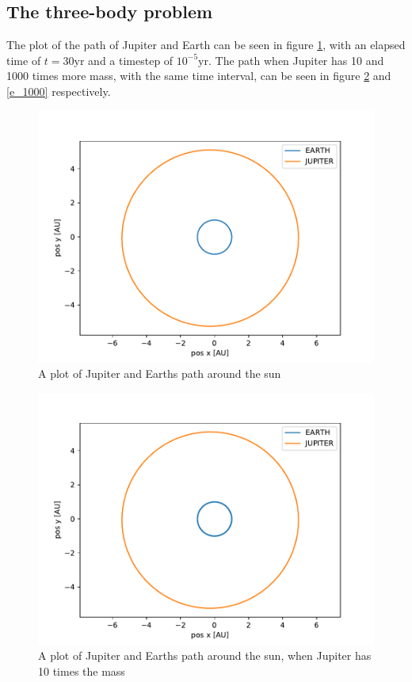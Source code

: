 \documentclass[a4paper]{article}
\begin{document}
\subsection{The three-body problem}
The plot of the path of Jupiter and Earth can be seen in figure \ref{e_1}, with an elapsed time of $t=30\text{yr}$ and a timestep of $10^{-5} \text{yr}$. The path when Jupiter has 10 and 1000 times more mass, with the same time interval, can be seen in figure \ref{e_10} and \ref{e_1000} respectively. 

\begin{figure}[h!]
		\centering 
		\includegraphics[scale=0.7]{../opp_e1.pdf}
		\caption{A plot of Jupiter and Earths path around the sun}
		\label{e_1}
\end{figure}
\begin{figure}[h!]
	\centering 
	\includegraphics[scale=0.7]{../opp_e10.pdf}
	\caption{A plot of Jupiter and Earths path around the sun, when Jupiter has 10 times the mass}
	\label{e_10}
\end{figure}
\end{document}
